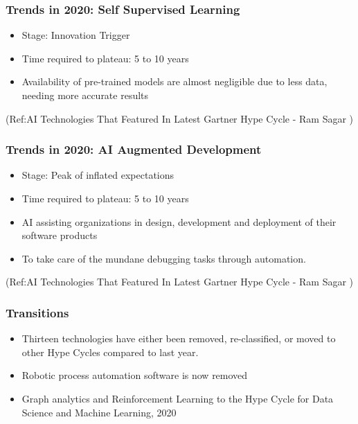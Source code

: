 \begin{frame}[fragile]\frametitle{Trends in 2020: Self Supervised Learning}
\begin{itemize}
\item Stage: Innovation Trigger
\item Time required to plateau: 5 to 10 years
\item Availability of pre-trained models are almost negligible due to less data, needing more accurate results
\end{itemize}


{\tiny (Ref:AI Technologies That Featured In Latest Gartner Hype Cycle - 
Ram Sagar )}

\end{frame}


\begin{frame}[fragile]\frametitle{Trends in 2020: AI Augmented Development}
\begin{itemize}
\item Stage: Peak of inflated expectations
\item Time required to plateau: 5 to 10 years
\item AI assisting organizations in design, development and deployment of their software products
\item To take care of the mundane debugging tasks through automation.
\end{itemize}


{\tiny (Ref:AI Technologies That Featured In Latest Gartner Hype Cycle - 
Ram Sagar )}

\end{frame}



\begin{frame}[fragile]\frametitle{Transitions}

\begin{itemize}
\item Thirteen technologies have either been removed, re-classified, or moved to other Hype Cycles compared to last year.
\item Robotic process automation software is now removed 
\item Graph analytics and Reinforcement Learning to the Hype Cycle for Data Science and Machine Learning, 2020
\end{itemize}



\end{frame}

